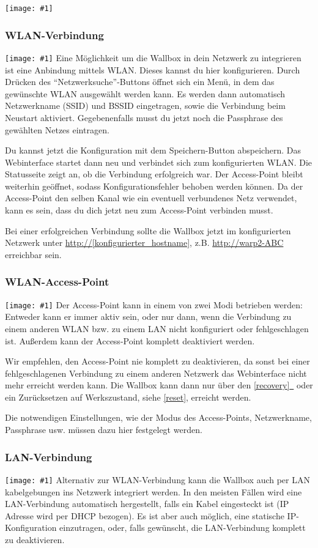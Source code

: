 \documentclass[a4paper,10pt]{article}
\newcommand{\hint}[1]{\begin{tcolorbox}[colback=boxgray,colframe=black,coltext=
white,title=Hinweis,left*=2mm,right*=2mm,boxsep=1mm,bottom=1mm,top=1mm]#1\end{tcolorbox}}
\newcommand{\gfx}[1]{\texttt{[image: \#1]}}
\newcommand*{\fullref}[1]{\hyperref[{#1}]{\ref*{#1}~\nameref*{#1}}}
\begin{document}
\begin{multicols*}{2}
	\gfx{./img_warp2/resized/web_network}


	\subsubsection{WLAN-Verbindung}
	\gfx{./img_warp2/resized/web_wifi_sta}
	Eine Möglichkeit um die Wallbox in dein Netzwerk zu integrieren ist eine
	Anbindung mittels WLAN. Dieses kannst du hier konfigurieren.
	Durch Drücken des \enquote{Netzwerksuche}-Buttons öffnet sich ein Menü, in dem das gewünschte WLAN ausgewählt werden kann.
	Es werden dann automatisch Netzwerkname (SSID) und BSSID eingetragen, sowie die Verbindung beim Neustart aktiviert.
	Gegebenenfalls musst du jetzt noch die Passphrase des gewählten Netzes eintragen.

	Du kannst jetzt die Konfiguration mit dem Speichern-Button abspeichern.
	Das Webinterface startet dann neu und verbindet sich zum konfigurierten WLAN. Die Statusseite zeigt
	an, ob die Verbindung erfolgreich war. Der Access-Point bleibt weiterhin
	geöffnet, sodass Konfigurationsfehler behoben werden können.
	Da der Access-Point den selben Kanal wie ein eventuell verbundenes Netz verwendet,
	kann es sein, dass du dich jetzt neu zum Access-Point verbinden musst.

	Bei einer erfolgreichen Verbindung sollte die Wallbox jetzt im konfigurierten Netzwerk unter
	\url{http://[konfigurierter_hostname]}, z.B. \url{http://warp2-ABC} erreichbar sein.

	\subsubsection{WLAN-Access-Point}
	\gfx{./img_warp2/resized/web_wifi_ap}
	Der Access-Point kann in einem von zwei Modi betrieben werden: Entweder kann er immer aktiv sein,
	oder nur dann, wenn die Verbindung zu einem anderen WLAN bzw. zu einem LAN nicht konfiguriert oder fehlgeschlagen ist.
	Außerdem kann der Access-Point komplett deaktiviert werden.
	\hint{Wir empfehlen, den Access-Point nie komplett zu deaktivieren, da sonst bei einer
		fehlgeschlagenen Verbindung zu einem anderen Netzwerk das Webinterface nicht mehr erreicht
		werden kann. Die Wallbox kann dann nur über den \fullref{recovery} oder ein Zurücksetzen auf Werkszustand, siehe \ref{reset}, erreicht werden.}
	Die notwendigen Einstellungen, wie der Modus des Access-Points,
	Netzwerkname, Passphrase usw. müssen dazu hier festgelegt werden.

	\subsubsection{LAN-Verbindung}
	\gfx{./img_warp2/resized/web_ethernet}
	Alternativ zur WLAN-Verbindung kann die Wallbox auch per LAN kabelgebungen
	ins Netzwerk integriert werden. In den meisten Fällen wird eine
	LAN-Verbindung automatisch hergestellt, falls ein Kabel eingesteckt ist
	(IP Adresse wird per DHCP bezogen). Es ist aber auch möglich,
	eine statische IP-Konfiguration	einzutragen, oder, falls gewünscht, die LAN-Verbindung
	komplett zu deaktivieren.


\end{multicols*}
\end{document}
